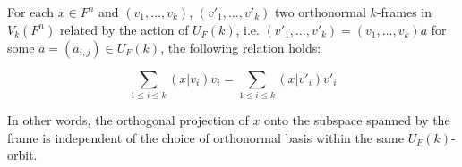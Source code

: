 For each $x \in F^n$ and $(v_1, \ldots, v_k)$, $(v'_1, \ldots, v'_k)$ two orthonormal $k$-frames in $V_k(F^n)$ related by the action of $U_F(k)$, i.e. $(v'_1, \ldots, v'_k) = (v_1, \ldots, v_k)a$ for some $a = (a_{i,j}) \in U_F(k)$, the following relation holds:

$$\sum_{1 \leq i \leq k} (x|v_i)v_i = \sum_{1 \leq i \leq k} (x|v'_i)v'_i$$

In other words, the orthogonal projection of $x$ onto the subspace spanned by the frame is independent of the choice of orthonormal basis within the same $U_F(k)$-orbit.
